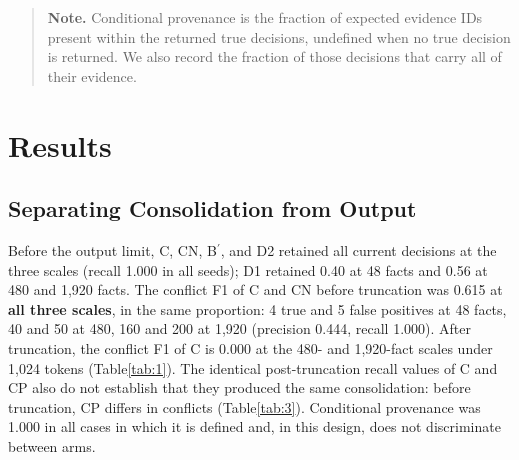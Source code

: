 \documentclass[11pt,a4paper]{article}
\begin{document}
\begin{quote}\small \textbf{Note.} Conditional provenance is the fraction of expected evidence IDs present within the returned true decisions, undefined when no true decision is returned. We also record the fraction of those decisions that carry all of their evidence.\end{quote}

\section{Results}\label{sec:5}
\subsection{Separating Consolidation from Output}\label{sec:5.1}
Before the output limit, C, CN, B\ensuremath{^{\prime}}, and D2 retained all current decisions at the three scales (recall 1.000 in all seeds); D1 retained 0.40 at 48 facts and 0.56 at 480 and 1,920 facts. The conflict F1 of C and CN before truncation was 0.615 at \textbf{all three scales}, in the same proportion: 4 true and 5 false positives at 48 facts, 40 and 50 at 480, 160 and 200 at 1,920 (precision 0.444, recall 1.000). After truncation, the conflict F1 of C is 0.000 at the 480- and 1,920-fact scales under 1,024 tokens (Table\nobreakspace{}\ref{tab:1}). The identical post-truncation recall values of C and CP also do not establish that they produced the same consolidation: before truncation, CP differs in conflicts (Table\nobreakspace{}\ref{tab:3}). Conditional provenance was 1.000 in all cases in which it is defined and, in this design, does not discriminate between arms.
\end{document}
